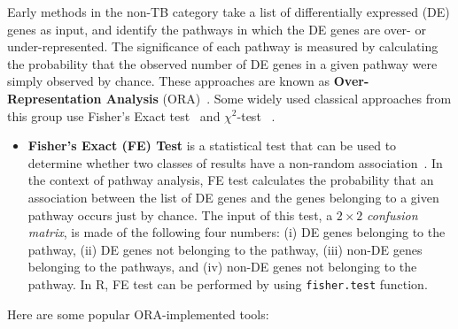 \documentclass[Minh_PhD_thesis.tex]{subfiles}
\begin{document}
Early methods in the non-TB category take a list of differentially expressed (DE) genes as input, and identify the pathways in which the DE genes are over- or under-represented.
The significance of each pathway is measured by calculating the probability that the observed number of DE genes in a given pathway were simply observed by chance. 
These approaches are known as \textbf{Over-Representation Analysis} (ORA)~\cite{khatri2005comparison, goeman2007analyzing}.
Some widely used classical approaches from this group use Fisher's Exact test~\cite{Fisher:1951} and $\chi^2$-test ~\cite{Fisher:1993}. 

\begin{itemize}
\item \textbf{Fisher's Exact (FE) Test} is a statistical test that can be used to determine whether two  classes of results have a non-random association~\cite{Fisher:1951}.
In the context of pathway analysis,  FE test calculates the probability that an association between the list of DE genes and the genes belonging to a given pathway occurs just by chance.
The input of this test, a $2 \times 2$ \textit{confusion matrix}, is made of the following four numbers: (i) DE genes belonging to the pathway, (ii) DE genes not belonging to the pathway, (iii) non-DE genes belonging to the pathways, and (iv) non-DE genes not belonging to the pathway. 
In R, FE test can be performed by using \texttt{fisher.test} function.
\end{itemize}


Here are some popular ORA-implemented tools:
\end{document}
